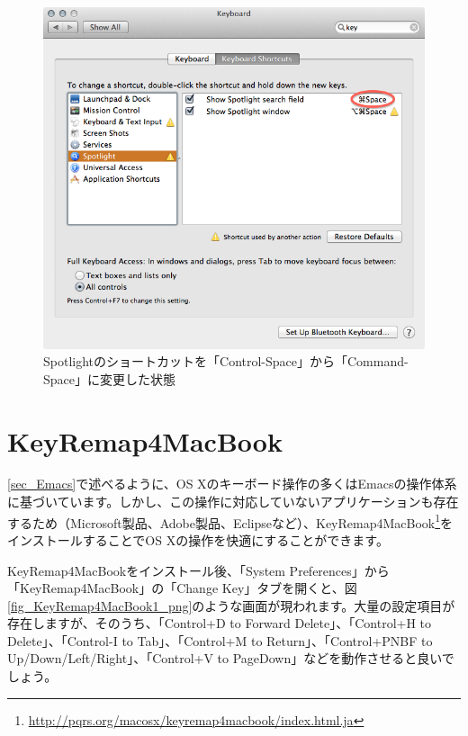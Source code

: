 \begin{figure}
  \centering
  \includegraphics[scale=0.35]{fig/Keyboard3.png}
  \caption{Spotlightのショートカットを「Control-Space」から「Command-Space」に変更した状態}
  \label{fig_Keyboard3_png}
\end{figure}

\section{KeyRemap4MacBook}
\label{sec_KeyRemap4MacBook}

\ref{sec_Emacs}で述べるように、OS Xのキーボード操作の多くはEmacsの操作体系に基づいています。しかし、この操作に対応していないアプリケーションも存在するため（Microsoft製品、Adobe製品、Eclipseなど）、KeyRemap4MacBook\footnote{\url{http://pqrs.org/macosx/keyremap4macbook/index.html.ja}}をインストールすることでOS Xの操作を快適にすることができます。

KeyRemap4MacBookをインストール後、「System Preferences」から「KeyRemap4MacBook」の「Change Key」タブを開くと、図\ref{fig_KeyRemap4MacBook1_png}のような画面が現われます。大量の設定項目が存在しますが、そのうち、「Control+D to Forward Delete」、「Control+H to Delete」、「Control-I to Tab」、「Control+M to Return」、「Control+PNBF to Up/Down/Left/Right」、「Control+V to PageDown」などを動作させると良いでしょう。

